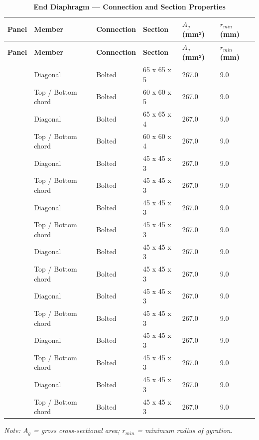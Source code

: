 \documentclass[12pt,a4paper]{report}
\numberwithin{table}{chapter}
\numberwithin{figure}{chapter}
\begin{document}
\begin{longtable}{|C{2.0cm}|L{2.0cm}|L{2.2cm}|C{2.5cm}|C{2.0cm}|C{2.0cm}|}
\caption{\textbf{End Diaphragm --- Connection and Section Properties}}\\
\hline
\textbf{Panel} & \textbf{Member} & \textbf{Connection} & \textbf{Section} & \textbf{$A_g$ (mm²)} & \textbf{$r_{min}$ (mm)} \\[6pt]
\hline
\endfirsthead
\hline
\textbf{Panel} & \textbf{Member} & \textbf{Connection} & \textbf{Section} & \textbf{$A_g$ (mm²)} & \textbf{$r_{min}$ (mm)} \\[6pt]
\hline
\endhead
{} & Diagonal & Bolted & 65 x 65 x 5 & 267.0 & 9.0 \\[6pt]
 & Top / Bottom chord & Bolted & 60 x 60 x 5 & 267.0 & 9.0 \\[6pt]
\hline
{} & Diagonal & Bolted & 65 x 65 x 4 & 267.0 & 9.0 \\[6pt]
 & Top / Bottom chord & Bolted & 60 x 60 x 4 & 267.0 & 9.0 \\[6pt]
\hline
{} & Diagonal & Bolted & 45 x 45 x 3 & 267.0 & 9.0 \\[6pt]
 & Top / Bottom chord & Bolted & 45 x 45 x 3 & 267.0 & 9.0 \\[6pt]
\hline
{} & Diagonal & Bolted & 45 x 45 x 3 & 267.0 & 9.0 \\[6pt]
 & Top / Bottom chord & Bolted & 45 x 45 x 3 & 267.0 & 9.0 \\[6pt]
\hline
{} & Diagonal & Bolted & 45 x 45 x 3 & 267.0 & 9.0 \\[6pt]
 & Top / Bottom chord & Bolted & 45 x 45 x 3 & 267.0 & 9.0 \\[6pt]
\hline
{} & Diagonal & Bolted & 45 x 45 x 3 & 267.0 & 9.0 \\[6pt]
 & Top / Bottom chord & Bolted & 45 x 45 x 3 & 267.0 & 9.0 \\[6pt]
\hline
{} & Diagonal & Bolted & 45 x 45 x 3 & 267.0 & 9.0 \\[6pt]
 & Top / Bottom chord & Bolted & 45 x 45 x 3 & 267.0 & 9.0 \\[6pt]
\hline
{} & Diagonal & Bolted & 45 x 45 x 3 & 267.0 & 9.0 \\[6pt]
 & Top / Bottom chord & Bolted & 45 x 45 x 3 & 267.0 & 9.0 \\[6pt]
\hline
\end{longtable}
\noindent\textit{Note: $A_g$ = gross cross-sectional area; $r_{min}$ = minimum radius of gyration.}
\end{document}
